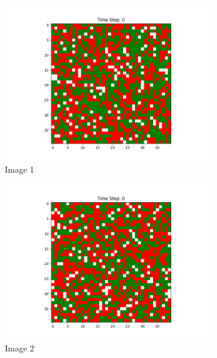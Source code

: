 \documentclass[12pt]{article}
\begin{document}
\begin{figure}[h]
\begin{subfigure}{0.2\textwidth}
			\includegraphics[width=\linewidth]{initial_cluster_w20b10.png}				\caption{Image 1}
		\end{subfigure}\hspace{0.02\textwidth}
		\begin{subfigure}{0.2\textwidth}
			\includegraphics[width=\linewidth]{initial_cluster_w5b20.png}				\caption{Image 2}
		\end{subfigure}\hspace{0.02\textwidth}
		\begin{subfigure}{0.2\textwidth}

\end{subfigure}
\end{figure}
\end{document}
